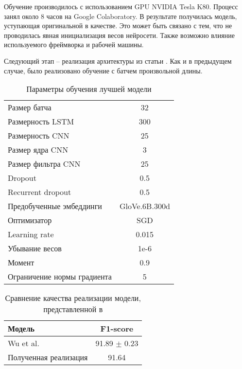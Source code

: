 \documentclass[a4paper,14pt]{extarticle}
\begin{document}
Обучение производилось с использованием GPU NVIDIA Tesla K80. Процесс занял около 8 часов на Google Colaboratory. В результате получилась модель, уступающая оригинальной в качестве. Это может быть связано с тем, что не проводилась явная инициализация весов нейросети. Также возможно влияние используемого фреймворка и рабочей машины.

Следующий этап -- реализация архитектуры из статьи \cite{1808.09075}. Как и в предыдущем случае, было реализовано обучение с батчем произвольной длины.

\begin{table}[H]
    \caption{Параметры обучения лучшей модели}
    \label{progress}
    \begin{center}
    \begin{tabular}{l|c}
        Размер батча & 32 \\
        Размерность LSTM & 300 \\
        Размерность CNN & 25 \\
        Размер ядра CNN & 3 \\
        Размер фильтра CNN & 25 \\
        Dropout & 0.5 \\
        Recurrent dropout & 0.5 \\
        Предобученные эмбеддинги & GloVe.6B.300d \\
        Оптимизатор & SGD \\
        Learning rate & 0.015 \\
        Убывание весов & 1e-6 \\
        Момент & 0.9 \\
        Ограничение нормы градиента & 5 \\
    \end{tabular}
    \end{center}
\end{table}

\begin{table}[H]
    \caption{Сравнение качества реализации модели, представленной в \cite{1808.09075}}
    \label{progress}
    \begin{center}
    \begin{tabular}{l|c}
        Модель                 & F1-score           \\
        \hline
        Wu et al.              & 91.89 $\pm$ 0.23   \\
        Полученная реализация  & 91.64              \\
    \end{tabular}
    \end{center}
\end{table}
\end{document}
